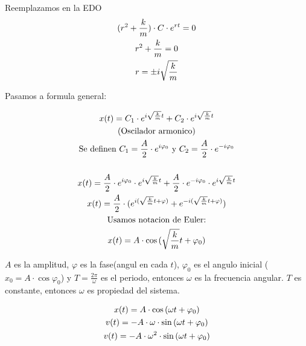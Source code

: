 Reemplazamos en la EDO
\begin{gather}
	\nonumber (r^2 + \frac{k}{m})  \cdot C \cdot e^{rt} = 0 \\
	\nonumber r^2 + \frac{k}{m} = 0 \\
	\nonumber r = \pm i \sqrt{\frac{k}{m}}
\end{gather}

Pasamos a formula general:

\begin{gather}
	\nonumber x(t)=C_1 \cdot e^{i\sqrt{\frac{k}{m}}t} + C_2 \cdot e^{i\sqrt{\frac{k}{m}}t} \\
	\nonumber\text{(Oscilador armonico)}\\
	\nonumber\text{Se definen } C_1 = \frac{A}{2}\cdot e^{i\varphi_0} 
	\nonumber\text{ y } C_2 = \frac{A}{2}\cdot e^{-i\varphi_0}\\
\\
	\nonumber x(t)=\frac{A}{2}\cdot e^{i\varphi_0} \cdot e^{i\sqrt{\frac{k}{m}}t} + \frac{A}{2}\cdot e^{-i\varphi_0} \cdot e^{i\sqrt{\frac{k}{m}}t}\\
	\nonumber x(t)=\frac{A}{2}\cdot(e^{i(\sqrt{\frac{k}{m}}t + \varphi)} + e^{-i(\sqrt{\frac{k}{m}}t + \varphi)} )\\
	\text{Usamos notacion de Euler:}\\
	\nonumber x(t) = A\cdot \cos{(\sqrt{\frac{k}{m}}t + \varphi_0)}
\end{gather}

$A$ es la amplitud, $\varphi$ es la fase(angul en cada $t$), $\varphi_0$ es el angulo inicial
($x_0=A\cdot \cos{ \varphi_0}$) y $T=\frac{2\pi}{\omega}$ es el periodo, entonces $\omega$ es la frecuencia angular. $T$ es constante, entonces $\omega$ es propiedad del sistema.

\begin{gather}
	\nonumber x(t)= A \cdot \cos{(\omega t + \varphi_0)}\\
	\nonumber v(t)= - A \cdot \omega \cdot \sin{(\omega t + \varphi_0)}\\
	\nonumber v(t)= - A \cdot \omega^2 \cdot \sin{(\omega t + \varphi_0)}
\end{gather}


